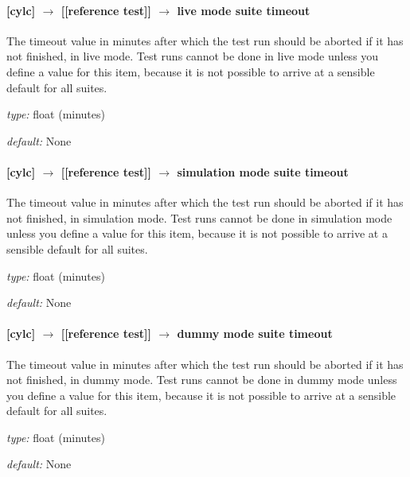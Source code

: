 \paragraph[live mode suite timeout]{[cylc] $\rightarrow$ [[reference test]] $\rightarrow$ live mode suite timeout}

The timeout value in minutes after which the test run should be aborted
if it has not finished, in live mode. Test runs cannot be done in live
mode unless you define a value for this item, because it is not possible
to arrive at a sensible default for all suites.

\begin{myitemize}
    \item {\em type:} float (minutes)
    \item {\em default:} None
\end{myitemize}

\paragraph[simulation mode suite timeout]{[cylc] $\rightarrow$ [[reference test]] $\rightarrow$ simulation mode suite timeout}

The timeout value in minutes after which the test run should be aborted
if it has not finished, in simulation mode. Test runs cannot be done in
simulation mode unless you define a value for this item, because it is
not possible to arrive at a sensible default for all suites.

\begin{myitemize}
    \item {\em type:} float (minutes)
    \item {\em default:} None
\end{myitemize}

\paragraph[dummy mode suite timeout]{[cylc] $\rightarrow$ [[reference test]] $\rightarrow$ dummy mode suite timeout}

The timeout value in minutes after which the test run should be aborted
if it has not finished, in dummy mode.  Test runs cannot be done in
dummy mode unless you define a value for this item, because it is not
possible to arrive at a sensible default for all suites.

\begin{myitemize}
    \item {\em type:} float (minutes)
    \item {\em default:} None
\end{myitemize}


